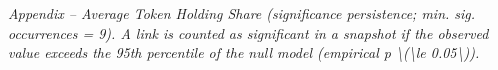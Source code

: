 \begin{table}[!ht]
\centering
\small
{}
\vspace{2mm}\textit{Appendix – Average Token Holding Share (significance persistence; min. sig. occurrences = 9). A link is counted as significant in a snapshot if the observed value exceeds the 95th percentile of the null model (empirical p \textbackslash{}(\textbackslash{}le 0.05\textbackslash{})).}
\end{table}